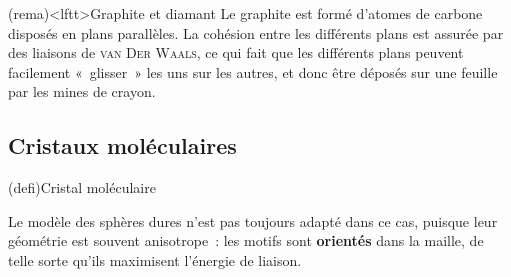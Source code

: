 \documentclass[../../main/main.tex]{subfiles}
\begin{document}
\begin{tcb}(rema)<lftt>{Graphite et diamant}
	Le graphite est formé d'atomes de carbone disposés en plans parallèles. La
	cohésion entre les différents plans est assurée par des liaisons de
	\textsc{van Der Waals}, ce qui fait que les différents plans peuvent
	facilement «~glisser~» les uns sur les autres, et donc être déposés sur une
	feuille par les mines de crayon.
\end{tcb}

\subsection{Cristaux moléculaires}
\begin{tcb*}(defi){Cristal moléculaire}
\end{tcb*}
Le modèle des sphères dures n'est pas toujours adapté dans ce cas, puisque leur
géométrie est souvent anisotrope~: les motifs sont \textbf{orientés} dans la
maille, de telle sorte qu'ils maximisent l'énergie de liaison.

\end{document}
